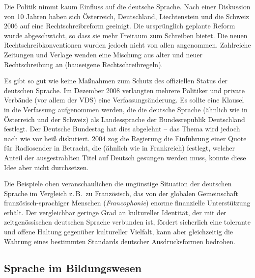 \documentclass[]{../../metanetpaper}
\begin{document}
\begin{multicols}{2}
Die Politik nimmt kaum Einfluss auf die deutsche Sprache. Nach einer Diskussion von 10 Jahren haben sich Österreich, Deutschland, Liechtenstein und die Schweiz 2006 auf eine Rechtschreibreform geeinigt. Die ursprünglich geplante Reform wurde abgeschwächt, so dass sie mehr Freiraum zum Schreiben bietet. Die neuen Rechtschreibkonventionen wurden jedoch nicht von allen angenommen. Zahlreiche Zeitungen und Verlage wenden eine Mischung aus alter und neuer Rechtschreibung an (hauseigene Rechtschreibregeln).


Es gibt so gut wie keine Maßnahmen zum Schutz des offiziellen Status der deutschen Sprache. Im Dezember 2008 verlangten mehrere Politiker und private Verbände (vor allem der VDS) eine Verfassungsänderung. Es sollte eine Klausel in die Verfassung aufgenommen werden, die die deutsche Sprache (ähnlich wie in Österreich und der Schweiz) als Landessprache der Bundesrepublik Deutschland festlegt. Der Deutsche Bundestag hat dies abgelehnt -- das Thema wird jedoch nach wie vor heiß diskutiert. 2004 zog die Regierung die Einführung einer Quote für Radiosender in Betracht, die (ähnlich wie in Frankreich) festlegt, welcher Anteil der ausgestrahlten Titel auf Deutsch gesungen werden muss, konnte diese Idee aber nicht durchsetzen.

Die Beispiele oben veranschaulichen die ungünstige Situation der deutschen Sprache im Vergleich z.\,B.~zu Französisch, das von der globalen Gemeinschaft französisch-sprachiger Menschen (\textit{Francophonie}) enorme finanzielle Unterstützung erhält. Der vergleichbar geringe Grad an kultureller Identität, der mit der zeitgenössischen deutschen Sprache verbunden ist, fördert sicherlich eine tolerante und offene Haltung gegenüber kultureller Vielfalt, kann aber gleichzeitig die Wahrung eines bestimmten Standards deutscher Ausdrucksformen bedrohen.

\subsection{Sprache im Bildungswesen}


\end{multicols}
\end{document}
